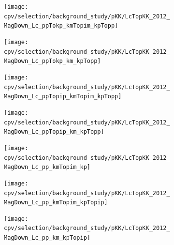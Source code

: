 \begin{figure}
  \begin{subfigure}[b]{0.3\textwidth}
    \texttt{[image: cpv/selection/background\_study/pKK/LcTopKK\_2012\_MagDown\_Lc\_ppTokp\_kmTopim\_kpTopp]}
    \caption{\decay{\PLambdac}{\PKplus\Ppiminus\Pproton}}
    \label{fig:cpv:selection:background_study:pKK_baryon:lcp_Kpip}
  \end{subfigure}
  \begin{subfigure}[b]{0.3\textwidth}
    \texttt{[image: cpv/selection/background\_study/pKK/LcTopKK\_2012\_MagDown\_Lc\_ppTokp\_km\_kpTopp]}
    \caption{\decay{\PLambdac}{\PKplus\PKminus\Pproton}}
    \label{fig:cpv:selection:background_study:pKK_baryon:lcp_KKp}
  \end{subfigure}
  \begin{subfigure}[b]{0.3\textwidth}
    \texttt{[image: cpv/selection/background\_study/pKK/LcTopKK\_2012\_MagDown\_Lc\_ppTopip\_kmTopim\_kpTopp]}
    \caption{\decay{\PLambdac}{\Ppiplus\Ppiminus\Pproton}}
    \label{fig:cpv:selection:background_study:pKK_baryon:lcp_pipip}
  \end{subfigure}

  \begin{subfigure}[b]{0.3\textwidth}
    \texttt{[image: cpv/selection/background\_study/pKK/LcTopKK\_2012\_MagDown\_Lc\_ppTopip\_km\_kpTopp]}
    \caption{\decay{\PLambdac}{\Ppiplus\PKminus\Pproton}}
    \label{fig:cpv:selection:background_study:pKK_baryon:lcp_pikp}
  \end{subfigure}
  \begin{subfigure}[b]{0.3\textwidth}
    \texttt{[image: cpv/selection/background\_study/pKK/LcTopKK\_2012\_MagDown\_Lc\_pp\_kmTopim\_kp]}
    \caption{\decay{\PLambdac}{\Pproton\Ppiminus\PKplus}}
    \label{fig:cpv:selection:background_study:pKK_baryon:lcp_ppik}
  \end{subfigure}
  \begin{subfigure}[b]{0.3\textwidth}
    \texttt{[image: cpv/selection/background\_study/pKK/LcTopKK\_2012\_MagDown\_Lc\_pp\_kmTopim\_kpTopip]}
    \caption{\decay{\PLambdac}{\Pproton\Ppiminus\Ppiplus}}
    \label{fig:cpv:selection:background_study:pKK_baryon:lcp_ppipi}
  \end{subfigure}

  \begin{subfigure}[b]{0.3\textwidth}
    \texttt{[image: cpv/selection/background\_study/pKK/LcTopKK\_2012\_MagDown\_Lc\_pp\_km\_kpTopip]}
    \caption{\decay{\PLambdac}{\Pproton\PKminus\Ppiplus}}
    \label{fig:cpv:selection:background_study:pKK_baryon:lcp_pkpi}
  \end{subfigure}


\end{figure}
